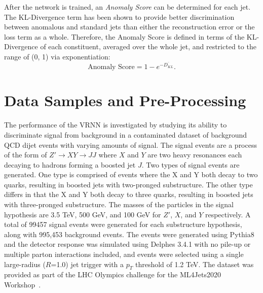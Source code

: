 \documentclass[11pt, a4paper]{article}
\begin{document}
After the network is trained, an \textit{Anomaly Score} can be determined for each jet. The KL-Divergence term has been shown to provide better discrimination between anomalous and standard jets than either the reconstruction error or the loss term as a whole. Therefore, the Anomaly Score is defined in terms of the KL-Divergence of each constituent, averaged over the whole jet, and restricted to the range of (0, 1) via exponentiation:
\begin{equation}
	\text{Anomaly Score} = 1 - e^{-\overline{D_{KL}}}.
\end{equation}




\section{Data Samples and Pre-Processing}


The performance of the VRNN is investigated by studying its ability to discriminate signal from background in a contaminated dataset of background QCD dijet events with varying amounts of signal. The signal events are a process of the form of $Z'\rightarrow XY \rightarrow JJ$ where $X$ and $Y$ are two heavy resonances each decaying to hadrons forming a boosted jet $J$. Two types of signal events are generated. One type is comprised of events where the X and Y both decay to two quarks, resulting in boosted jets with two-pronged substructure. The other type differs in that the X and Y both decay to three quarks, resulting in boosted jets with three-pronged substructure. The masses of the particles in the signal hypothesis are 3.5 TeV, 500 GeV, and 100 GeV for $Z'$, $X$, and $Y$ respectively. A total of 99457 signal events were generated for each substructure hypothesis, along with 995,453 background events. The events were generated using {\sc Pythia8} and the detector response was simulated using {\sc Delphes 3.4.1} with no pile-up or multiple parton interactions included, and events were selected using a single large-radius ($R$=1.0) jet trigger with a $p_T$ threshold of 1.2 TeV. The dataset was provided as part of the LHC Olympics challenge for the ML4Jets2020 Workshop~\cite{dataset}. 
\end{document}
